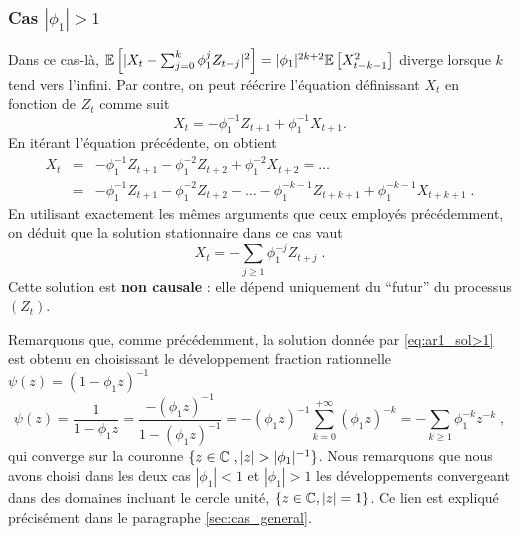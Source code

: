 \subsubsection{Cas $|\phi_1| > 1$}
Dans ce cas-l\`a, ${\mathbb E}\left[ |X_t-\sum_{j=0}^{k}\phi_1^j
Z_{t-j}|^2 \right] = |\phi_1|^{2k+2} {\mathbb E}\left[ X_{t-k-1}^2 \right]$ diverge
lorsque $k$ tend vers l'infini. Par contre, on peut
r\'e\'ecrire l'\'equation d\'efinissant $X_t$ en fonction de $Z_t$ comme suit
$$
X_t=-\phi_1^{-1} Z_{t+1}+\phi_1^{-1} X_{t+1}.
$$
En it\'erant l'\'equation pr\'ec\'edente, on obtient
\begin{eqnarray*}
X_t&=&-\phi_1^{-1} Z_{t+1}-\phi_1^{-2} Z_{t+2}+\phi_1^{-2} X_{t+2}=\dots\\
&=&-\phi_1^{-1} Z_{t+1}-\phi_1^{-2} Z_{t+2}-\dots-\phi_1^{-k-1}
Z_{t+k+1}+\phi_1^{-k-1} X_{t+k+1}\; .
\end{eqnarray*}
En utilisant exactement les m\^{e}mes arguments que ceux employ\'es
pr\'ec\'edemment, on d\'eduit que la solution stationnaire dans ce cas vaut
\begin{equation}
\label{eq:ar1_sol>1}
X_t=-\sum_{j\geq 1} \phi_1^{-j} Z_{t+j}\; .
\end{equation}
Cette solution est  \textbf{non causale} : elle d\'epend
uniquement du ``futur'' du processus $(Z_t)$.

Remarquons que, comme pr\'ec\'edemment, la solution donn\'ee par \eqref{eq:ar1_sol>1} est obtenu
en choisissant le d\'eveloppement fraction rationnelle $\psi(z)=(1-\phi_1
z)^{-1}$
\[
  \psi(z)=\frac{1}{1-\phi_1 z} = \frac{-(\phi_1 z)^{-1}}{1-(\phi_1
    z)^{-1}}=-(\phi_1 z)^{-1}\sum_{k=0}^{+\infty} (\phi_1 z)^{-k}
=-\sum_{k\geq 1}\phi_1^{-k} z^{-k}\;,
\]
qui converge sur la couronne $ \{ z \in \mathbb{C} \;, |z| > |\phi_1|^{-1} \}$. Nous remarquons que
nous avons choisi dans les deux cas $|\phi_1| < 1$ et $|\phi_1| > 1$ les d\'eveloppements convergeant
dans des domaines incluant le cercle unit\'e, $\{ z \in \mathbb{C}, |z|=1 \}$.
Ce lien est expliqu\'e pr\'ecis\'ement dans le paragraphe \ref{sec:cas_general}.

